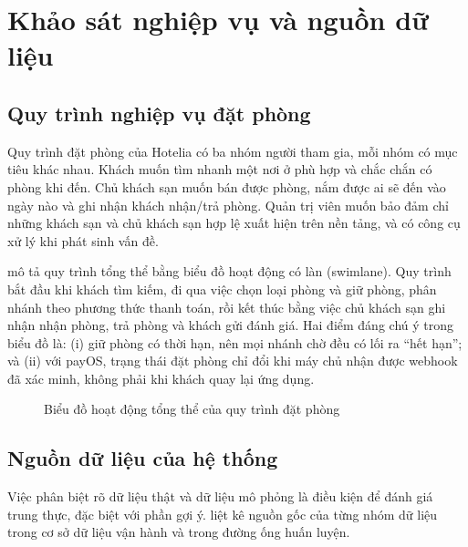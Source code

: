 \section{Khảo sát nghiệp vụ và nguồn dữ liệu}\label{sec:survey}

\subsection{Quy trình nghiệp vụ đặt phòng}

Quy trình đặt phòng của Hotelia có ba nhóm người tham gia, mỗi nhóm có mục tiêu khác nhau. Khách muốn tìm nhanh một nơi ở phù hợp và chắc chắn có phòng khi đến. Chủ khách sạn muốn bán được phòng, nắm được ai sẽ đến vào ngày nào và ghi nhận khách nhận/trả phòng. Quản trị viên muốn bảo đảm chỉ những khách sạn và chủ khách sạn hợp lệ xuất hiện trên nền tảng, và có công cụ xử lý khi phát sinh vấn đề.

 mô tả quy trình tổng thể bằng biểu đồ hoạt động có làn (swimlane). Quy trình bắt đầu khi khách tìm kiếm, đi qua việc chọn loại phòng và giữ phòng, phân nhánh theo phương thức thanh toán, rồi kết thúc bằng việc chủ khách sạn ghi nhận nhận phòng, trả phòng và khách gửi đánh giá. Hai điểm đáng chú ý trong biểu đồ là: (i) giữ phòng có thời hạn, nên mọi nhánh chờ đều có lối ra ``hết hạn''; và (ii) với payOS, trạng thái đặt phòng chỉ đổi khi máy chủ nhận được webhook đã xác minh, không phải khi khách quay lại ứng dụng.

\begin{figure}[H]
\centering
{}
\caption{Biểu đồ hoạt động tổng thể của quy trình đặt phòng}\label{fig:act-overall}
\end{figure}

\subsection{Nguồn dữ liệu của hệ thống}\label{sec:data-sources}

Việc phân biệt rõ dữ liệu thật và dữ liệu mô phỏng là điều kiện để đánh giá trung thực, đặc biệt với phần gợi ý.  liệt kê nguồn gốc của từng nhóm dữ liệu trong cơ sở dữ liệu vận hành và trong đường ống huấn luyện.

